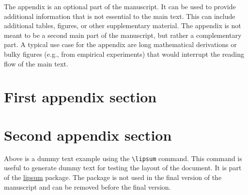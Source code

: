 \appendix
\label{cha:appendix}

The appendix is an optional part of the manuscript. It can be used to provide additional information that is not essential to the main text. This can include additional tables, figures, or other supplementary material. The appendix is not meant to be a second main part of the manuscript, but rather a complementary part. A typical use case for the appendix are long mathematical derivations or bulky figures (e.g., from empirical experiments) that would interrupt the reading flow of the main text.


\section{First appendix section}
\lipsum[1]

\section{Second appendix section}
Above is a dummy text example using the  \verb|\lipsum| command. This command is useful to generate dummy text for testing the layout of the document. It is part of the \href{https://ctan.org/pkg/lipsum}{lipsum} package. The package is not used in the final version of the manuscript and can be removed before the final version.